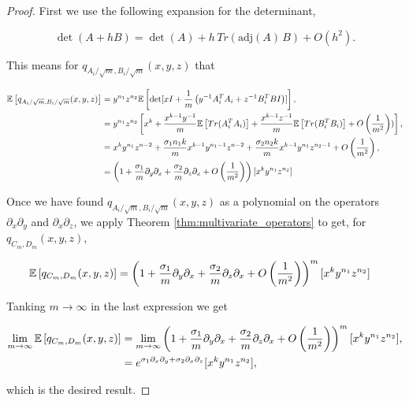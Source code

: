     \begin{proof}
        First we use the following expansion for the determinant,

        \begin{equation*}
            \det( { A} + h { B} ) = \det({ A})  + h \, Tr \left( \mbox{adj} ({A}) \, { B} \right) + O \left(h^2\right).
        \end{equation*}

        This means for $q_{A_i/\sqrt m, B_i/\sqrt m}(x,y,z)$ that

        \begin{align*}
            \mathbb E \left[ q_{A_i/\sqrt m, B_i/\sqrt m}(x,y,z) \right] &= y^{n_1}z^{n_2}\mathbb E \left[  \det[ xI + \frac{1}{m}\left( y^{-1}A^T_i A_i + z^{-1}B^T_i BI \right) ]  \right], \\ 
            &= y^{n_1}z^{n_2}\left[ x^k + \frac{x^{k-1}y^{-1}}{m}\mathbb E \left[ Tr(A^T_iA_i) \right] + \frac{x^{k-1}z^{-1}}{m}\mathbb E \left[ Tr(B^T_i B_i) \right] + O\left(\frac{1}{m^2}\right))\right],\\ 
            &= x^k y^{n_1}z^{n-2} + \frac{\sigma_1 n_1 k}{m}x^{k-1}y^{n_1-1}z^{n-2} + \frac{\sigma_2 n_2 k}{m}x^{k-1}y^{n_1}z^{n_2-1} + O \left(\frac{1}{m^2}\right), \\
            &= \left( 1 + \frac{\sigma_1}{m}\partial_y\partial_x + \frac{\sigma_2}{m}\partial_z\partial_x + O \left(\frac{1}{m^2}\right)\right)[x^k y^{n_1} z^{n_2}]
        \end{align*}

    Once we have found $q_{A_i/\sqrt m, B_i/\sqrt{m}}(x,y,z)$ as a polynomial on the operators $\partial_x \partial_y$ and $\partial_x \partial_z$, we apply Theorem \ref{thm:multivariate_operators} to get, for $q_{C_m,D_m}(x,y,z)$,

    \begin{align*}
        \mathbb E \left[  q_{C_m,D_m}(x,y,z)  \right] &= \left( 1 + \frac{\sigma_1}{m}\partial_y\partial_x + \frac{\sigma_2}{m}\partial_z\partial_x + O \left(\frac{1}{m^2}\right)\right)^m[x^k y^{n_1} z^{n_2}]
    \end{align*}

    Tanking $m\to \infty$ in the last expression we get

    \begin{align*}
        \lim_{m\to\infty} \mathbb E \left[ q_{C_m,D_m}(x,y,z) \right] &= \lim_{m\to\infty} \left( 1 + \frac{\sigma_1}{m}\partial_y\partial_x + \frac{\sigma_2}{m}\partial_z\partial_x + O \left(\frac{1}{m^2}\right)\right)^m[x^k y^{n_1} z^{n_2}],\\
        &= e^{\sigma_1 \partial_x\partial_y + \sigma_2 \partial_x \partial_z}[x^k y^{n_1}z^{n_2}],
    \end{align*}

    \noindent which is the desired result.
    \end{proof}

